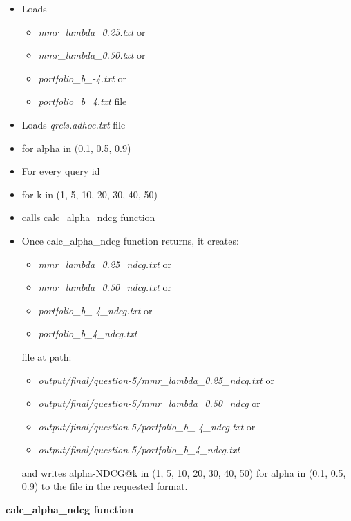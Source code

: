\documentclass{article} %
\begin{document}
\begin{itemize}
    \item Loads
    \begin{itemize}
        \item \textit{mmr\_lambda\_0.25.txt} or
        \item \textit{mmr\_lambda\_0.50.txt} or
        \item \textit{portfolio\_b\_-4.txt} or
        \item \textit{portfolio\_b\_4.txt} file
    \end{itemize}
    \item Loads \textit{qrels.adhoc.txt} file
    \item for alpha in (0.1, 0.5, 0.9)
    \item For every query id
    \item for k in (1, 5, 10, 20, 30, 40, 50)
    \item calls calc\_alpha\_ndcg function
    \item Once calc\_alpha\_ndcg function returns, it creates:
    \begin{itemize}
        \item \textit{mmr\_lambda\_0.25\_ndcg.txt} or
        \item \textit{mmr\_lambda\_0.50\_ndcg.txt} or
        \item \textit{portfolio\_b\_-4\_ndcg.txt} or
        \item \textit{portfolio\_b\_4\_ndcg.txt}    
    \end{itemize}
    file at path:
     \begin{itemize}
         \item \textit{output/final/question-5/mmr\_lambda\_0.25\_ndcg.txt} or
         \item \textit{output/final/question-5/mmr\_lambda\_0.50\_ndcg} or
         \item \textit{output/final/question-5/portfolio\_b\_-4\_ndcg.txt} or
         \item \textit{output/final/question-5/portfolio\_b\_4\_ndcg.txt}
     \end{itemize} and writes alpha-NDCG@k in (1, 5, 10, 20, 30, 40, 50) for alpha in (0.1, 0.5, 0.9) to the file in the requested format.
\end{itemize}

\textbf{calc\_alpha\_ndcg function}
\end{document}
